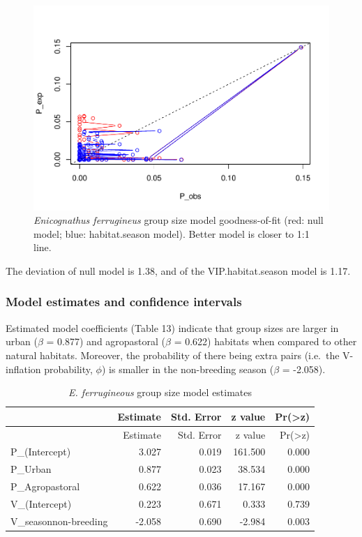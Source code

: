 \documentclass[]{article}
\begin{document}
\begin{figure}[H]
\includegraphics{Patagonia_parrots_density_analysis_files/figure-latex/unnamed-chunk-16-1} \caption{\textit{Enicognathus ferrugineus} group size model goodness-of-fit (red: null model; blue: habitat.season model). Better model is closer to 1:1 line.}\label{fig:unnamed-chunk-16}
\end{figure}

The deviation of null model is 1.38, and of the VIP.habitat.season model
is 1.17.

\subsubsection{Model estimates and confidence
intervals}\label{model-estimates-and-confidence-intervals}

Estimated model coefficients (Table 13) indicate that group sizes are
larger in urban (\(\beta\) = 0.877) and agropastoral (\(\beta\) = 0.622)
habitats when compared to other natural habitats. Moreover, the
probability of there being extra pairs (i.e.~the V-inflation
probability, \(\phi\)) is smaller in the non-breeding season (\(\beta\)
= -2.058).

\begin{longtable}[]{@{}lrrrr@{}}
\caption{\textit{E. ferrugineous} group size model
estimates}\tabularnewline
\toprule
& Estimate & Std. Error & z value &
Pr(\textgreater{}\textbar{}z\textbar{})\tabularnewline
\midrule
\endfirsthead
\toprule
& Estimate & Std. Error & z value &
Pr(\textgreater{}\textbar{}z\textbar{})\tabularnewline
\midrule
\endhead
P\_(Intercept) & 3.027 & 0.019 & 161.500 & 0.000\tabularnewline
P\_Urban & 0.877 & 0.023 & 38.534 & 0.000\tabularnewline
P\_Agropastoral & 0.622 & 0.036 & 17.167 & 0.000\tabularnewline
V\_(Intercept) & 0.223 & 0.671 & 0.333 & 0.739\tabularnewline
V\_seasonnon-breeding & -2.058 & 0.690 & -2.984 & 0.003\tabularnewline
\bottomrule
\end{longtable}
\end{document}
